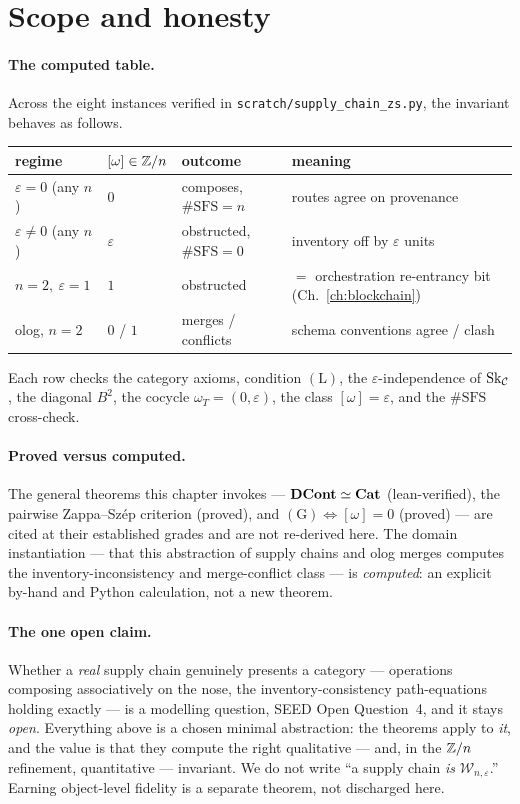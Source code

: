 \section{Scope and honesty}
\label{sec:supply-status}

\paragraph{The computed table.} Across the eight instances verified in
\texttt{scratch/supply\_chain\_zs.py}, the invariant behaves as follows.
\begin{center}
\begin{tabular}{@{}llll@{}}
\toprule
regime & $[\omega]\in\mathbb{Z}/n$ & outcome & meaning \\
\midrule
$\varepsilon=0$ (any $n$) & $0$ & composes, $\#\mathrm{SFS}=n$ & routes agree on provenance \\
$\varepsilon\ne0$ (any $n$) & $\varepsilon$ & obstructed, $\#\mathrm{SFS}=0$ & inventory off by $\varepsilon$ units \\
$n=2,\ \varepsilon=1$ & $1$ & obstructed & $=$ orchestration re-entrancy bit (Ch.~\ref{ch:blockchain}) \\
olog, $n=2$ & $0$ / $1$ & merges / conflicts & schema conventions agree / clash \\
\bottomrule
\end{tabular}
\end{center}
Each row checks the category axioms, condition $(\mathrm{L})$, the
$\varepsilon$-independence of $\mathrm{Sk}_{\mathcal{C}}$, the diagonal $B^2$, the cocycle
$\omega_T=(0,\varepsilon)$, the class $[\omega]=\varepsilon$, and the
$\#\mathrm{SFS}$ cross-check.

\paragraph{Proved versus computed.} The general theorems this chapter invokes ---
$\mathbf{DCont}\simeq\mathbf{Cat}$ (lean-verified), the pairwise Zappa--Sz\'ep criterion
(proved), and $(\mathrm{G})\Leftrightarrow[\omega]=0$ (proved) --- are cited at
their established grades and are not re-derived here. The domain instantiation ---
that this abstraction of supply chains and olog merges computes the
inventory-inconsistency and merge-conflict class --- is \emph{computed}: an
explicit by-hand and Python calculation, not a new theorem.

\paragraph{The one open claim.} Whether a \emph{real} supply chain genuinely
presents a category --- operations composing associatively on the nose, the
inventory-consistency path-equations holding exactly --- is a modelling question,
SEED Open Question~4, and it stays \emph{open}. Everything above is a chosen
minimal abstraction: the theorems apply to \emph{it}, and the value is that they
compute the right qualitative --- and, in the $\mathbb{Z}/n$ refinement, quantitative ---
invariant. We do not write ``a supply chain \emph{is} $\mathcal W_{n,\varepsilon}$.''
Earning object-level fidelity is a separate theorem, not discharged here.

